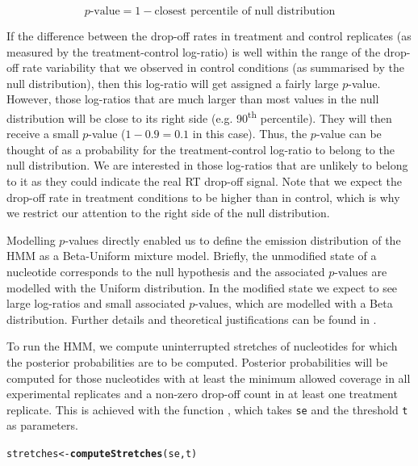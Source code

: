 \documentclass{article}\usepackage[]{graphicx}\usepackage[usenames,dvipsnames]{color}
\makeatletter
\newcommand{\hlstd}[1]{\textcolor[rgb]{0.345,0.345,0.345}{#1}}%
\newcommand{\hlkwb}[1]{\textcolor[rgb]{0.69,0.353,0.396}{#1}}%
\newcommand{\hlkwd}[1]{\textcolor[rgb]{0.737,0.353,0.396}{\textbf{#1}}}%
\newenvironment{kframe}{%
 \def\at@end@of@kframe{}%
 \ifinner\ifhmode%
  \def\at@end@of@kframe{\end{minipage}}%
  \begin{minipage}{\columnwidth}%
 \fi\fi%
 \def\FrameCommand##1{\hskip\@totalleftmargin \hskip-\fboxsep
 \colorbox{shadecolor}{##1}\hskip-\fboxsep
     \hskip-\linewidth \hskip-\@totalleftmargin \hskip\columnwidth}%
 \MakeFramed {\advance\hsize-\width
   \@totalleftmargin\z@ \linewidth\hsize
   \@setminipage}}%
 {\par\unskip\endMakeFramed%
 \at@end@of@kframe}
\newenvironment{knitrout}{}{} %
\makeatother
\begin{document}
\[\textrm{$p$-value} = 1 - \textrm{closest percentile of null distribution}\]

If the difference between the drop-off rates in treatment and control replicates
(as measured by the treatment-control log-ratio) is well within the range of the
drop-off rate variability that we observed in control conditions (as summarised
by the null distribution), then this log-ratio will get assigned a fairly large
$p$-value. However, those log-ratios that are much larger than most values in
the null distribution will be close to its right side
(e.g. 90\textsuperscript{th} percentile). They will then receive a small
$p$-value ($1 - 0.9 = 0.1$ in this case). Thus, the $p$-value can be thought of
as a probability for the treatment-control log-ratio to belong to the null
distribution. We are interested in those log-ratios that are unlikely to belong
to it as they could indicate the real RT drop-off signal. Note that we expect
the drop-off rate in treatment conditions to be higher than in control, which is
why we restrict our attention to the right side of the null distribution.

Modelling $p$-values directly enabled us to define the emission distribution of
the HMM as a Beta-Uniform mixture model. Briefly, the unmodified state of a
nucleotide corresponds to the null hypothesis and the associated $p$-values are
modelled with the Uniform distribution. In the modified state we expect to see
large log-ratios and small associated $p$-values, which are modelled with a Beta
distribution. Further details and theoretical justifications can be found in
\cite{selega2016robust}.

To run the HMM, we compute uninterrupted stretches of nucleotides for which the
posterior probabilities are to be computed. Posterior probabilities will be
computed for those nucleotides with at least the minimum allowed coverage in all
experimental replicates and a non-zero drop-off count in at least one treatment
replicate. This is achieved with the function ,
which takes \texttt{se} and the threshold \texttt{t} as parameters.

\begin{knitrout}
\color{fgcolor}\begin{kframe}
\begin{alltt}
\hlstd{stretches} \hlkwb{<-} \hlkwd{computeStretches}\hlstd{(se, t)}
\end{alltt}
\end{kframe}
\end{knitrout}
\end{document}
